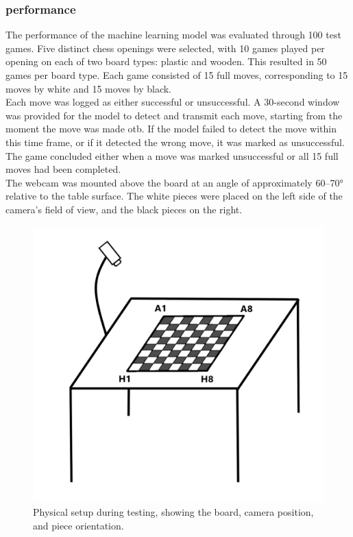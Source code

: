 \subsubsection*{performance}
The performance of the machine learning model was evaluated through 100 test games. Five distinct chess openings were selected, with 10 games played per opening on each of two board types: plastic and wooden. This resulted in 50 games per board type. Each game consisted of 15 full moves, corresponding to 15 moves by white and 15 moves by black. \\

Each move was logged as either successful or unsuccessful. A 30-second window was provided for the model to detect and transmit each move, starting from the moment the move was made \gls{otb}. If the model failed to detect the move within this time frame, or if it detected the wrong move, it was marked as unsuccessful. The game concluded either when a move was marked unsuccessful or all 15 full moves had been completed. \\

The webcam was mounted above the board at an angle of approximately 60–70\si{\degree}
 relative to the table surface. The white pieces were placed on the left side of the camera's field of view, and the black pieces on the right.

\begin{figure}[h!]
    \centering
    \includegraphics[width=0.75\linewidth]{figures/methods/testing/setup.png}
    \caption[Setup during testing]{Physical setup during testing, showing the board, camera position, and piece orientation.}
    \label{fig:setup}
\end{figure}



